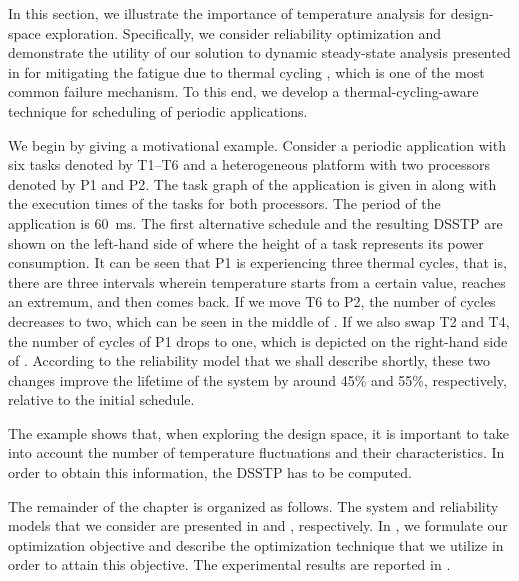 In this section, we illustrate the importance of temperature analysis for
design-space exploration. Specifically, we consider reliability optimization and
demonstrate the utility of our solution to dynamic steady-state analysis
presented in  for mitigating the fatigue due
to thermal cycling \cite{jedec2010}, which is one of the most common failure
mechanism. To this end, we develop a thermal-cycling-aware technique for
scheduling of periodic applications.

We begin by giving a motivational example. Consider a periodic application with
six tasks denoted by T1--T6 and a heterogeneous platform with two processors
denoted by P1 and P2. The task graph of the application is given in
 along with the execution times of the tasks
for both processors. The period of the application is 60~ms. The first
alternative schedule and the resulting \acf{DSSTP} are shown on the left-hand
side of  where the height of a task represents
its power consumption. It can be seen that P1 is experiencing three thermal
cycles, that is, there are three intervals wherein temperature starts from a
certain value, reaches an extremum, and then comes back. If we move T6 to P2,
the number of cycles decreases to two, which can be seen in the middle of
. If we also swap T2 and T4, the number of
cycles of P1 drops to one, which is depicted on the right-hand side of
. According to the reliability model that we
shall describe shortly, these two changes improve the lifetime of the system by
around 45\% and 55\%, respectively, relative to the initial schedule.

The example shows that, when exploring the design space, it is important to
take into account the number of temperature fluctuations and their
characteristics. In order to obtain this information, the \ac{DSSTP} has to be
computed.

The remainder of the chapter is organized as follows. The system and reliability
models that we consider are presented in  and
, respectively. In ,
we formulate our optimization objective and describe the optimization technique
that we utilize in order to attain this objective. The experimental results are
reported in .

